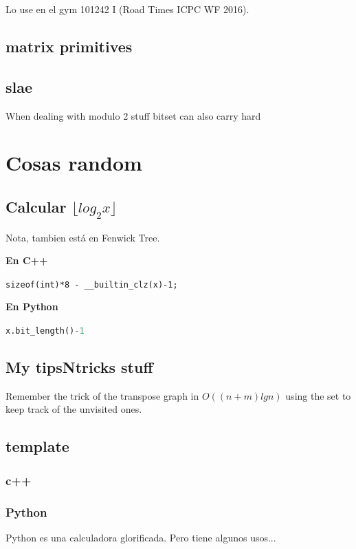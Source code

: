 \documentclass[landscape, 9pt, a4paper, oneside, twocolumn]{extarticle}
\begin{document}
	Lo use en el gym 101242 I (Road Times ICPC WF 2016). 
	
	\subsection{matrix primitives}
	
	\subsection{slae}
	When dealing with modulo 2 stuff bitset can also carry hard
	

\section {Cosas random}
	\subsection{Calcular \(\lfloor log_2x\rfloor\)}
	Nota, tambien está en Fenwick Tree.
	
	\textbf{En C++ }
	
	\lstinline|sizeof(int)*8 - __builtin_clz(x)-1;|
	
	\textbf{En Python }
	
	\lstinline[language=python]|x.bit_length()-1|
	
	\subsection{My tipsNtricks stuff}
	Remember the trick of the transpose graph in $O((n+m)lg n)$ using the set to keep track of the unvisited ones.
	
	
	\subsection{template}
	\subsubsection{c++}
	
	
	\subsubsection{Python}
	Python es una calculadora glorificada. Pero tiene algunos usos...
	
\end{document}
